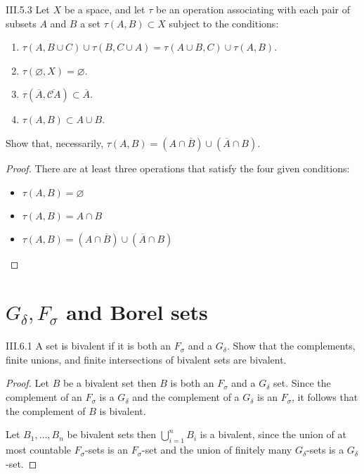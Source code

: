\begin{problem}{III.5.3}
Let \(X\) be a space, and let \( \tau \) be an operation associating with each pair of subsets \(A\) and \(B\) a set \(\tau(A, B) \subset X\) subject to the conditions:
\begin{enumerate}[label={\alph*.}]
	\item \( \tau(A, B \cup C) \cup \tau(B, C\cup A) = \tau(A\cup B, C) \cup \tau(A, B) \).
	\item \( \tau(\varnothing, X) = \varnothing \).
	\item \( \tau(\overline{A}, \overline{\mathscr{C}A}) \subset \overline{A} \).
	\item \( \tau(A, B) \subset A \cup B \).
\end{enumerate}

Show that, necessarily, \( \tau(A, B) = (A \cap \overline{B}) \cup (\overline{A} \cap B) \).
\end{problem}

\begin{proof}
    There are at least three operations that satisfy the four given conditions:
    \begin{itemize}
        \item \( \tau(A, B) = \varnothing \)
        \item \( \tau(A, B) = A \cap B \)
        \item \( \tau(A, B) = (A \cap \overline{B}) \cup (\overline{A} \cap B) \)
    \end{itemize}
\end{proof}

\section{\( G_{\delta}, F_{\sigma} \) and Borel sets}

\begin{problem}{III.6.1}\label{problem:III.6.1}
A set is bivalent if it is both an \(F_{\sigma}\) and a \(G_{\delta}\). Show that the complements, finite unions, and finite intersections of bivalent sets are bivalent.
\end{problem}

\begin{proof}
	Let \(B\) be a bivalent set then \(B\) is both an \(F_{\sigma}\) and a \(G_{\delta}\) set. Since the complement of an \(F_{\sigma}\) is a \(G_{\delta}\) and the complement of a \(G_{\delta}\) is an \(F_{\sigma}\), it follows that the complement of \(B\) is bivalent.

	Let \( B_{1}, \ldots, B_{n} \) be bivalent sets then \( \bigcup^{n}_{i=1}B_{i} \) is a bivalent, since the union of at most countable \(F_{\sigma}\)-sets is an \(F_{\sigma}\)-set and the union of finitely many \(G_{\delta}\)-sets is a \(G_{\delta}\)-set.
\end{proof}

